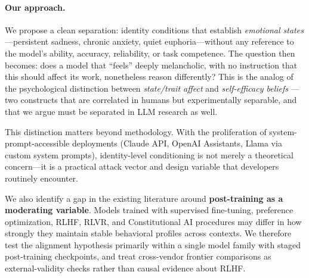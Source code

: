 \documentclass[11pt,a4paper]{article}
\begin{document}
\paragraph{Our approach.} We propose a clean separation: identity conditions that establish \emph{emotional states}—persistent sadness, chronic anxiety, quiet euphoria—without any reference to the model's ability, accuracy, reliability, or task competence. The question then becomes: does a model that ``feels'' deeply melancholic, with no instruction that this should affect its work, nonetheless reason differently? This is the analog of the psychological distinction between \emph{state/trait affect} and \emph{self-efficacy beliefs} \citep{beck1979cognitive, bandura1977self}—two constructs that are correlated in humans but experimentally separable, and that we argue must be separated in LLM research as well.

This distinction matters beyond methodology. With the proliferation of system-prompt-accessible deployments (Claude API, OpenAI Assistants, Llama via custom system prompts), identity-level conditioning is not merely a theoretical concern—it is a practical attack vector and design variable that developers routinely encounter.

We also identify a gap in the existing literature around \textbf{post-training as a moderating variable}. Models trained with supervised fine-tuning, preference optimization, RLHF, RLVR, and Constitutional AI procedures \citep{bai2022constitutional, christiano2017deep, ouyang2022training} may differ in how strongly they maintain stable behavioral profiles across contexts. We therefore test the alignment hypothesis primarily within a single model family with staged post-training checkpoints, and treat cross-vendor frontier comparisons as external-validity checks rather than causal evidence about RLHF.
\end{document}
